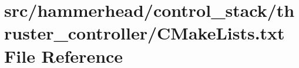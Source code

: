 \hypertarget{control__stack_2thruster__controller_2CMakeLists_8txt}{}\section{src/hammerhead/control\+\_\+stack/thruster\+\_\+controller/\+C\+Make\+Lists.txt File Reference}
\label{control__stack_2thruster__controller_2CMakeLists_8txt}
